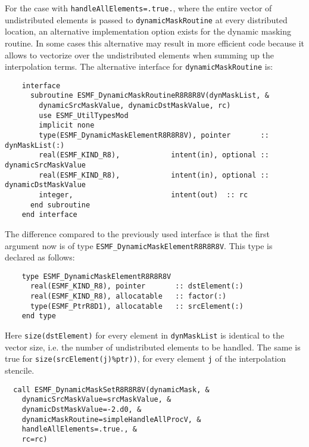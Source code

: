 
   For the case with {\tt handleAllElements=.true.}, where the entire
   vector of undistributed elements is passed to {\tt dynamicMaskRoutine} at
   every distributed location, an alternative implementation option exists for
   the dynamic masking routine. In some cases this alternative may result in
   more efficient code because it allows to vectorize over the undistributed
   elements when summing up the interpolation terms. The alternative interface
   for {\tt dynamicMaskRoutine} is:
  
   \begin{verbatim}
    interface
      subroutine ESMF_DynamicMaskRoutineR8R8R8V(dynMaskList, &
        dynamicSrcMaskValue, dynamicDstMaskValue, rc)
        use ESMF_UtilTypesMod
        implicit none
        type(ESMF_DynamicMaskElementR8R8R8V), pointer       :: dynMaskList(:)
        real(ESMF_KIND_R8),            intent(in), optional :: dynamicSrcMaskValue
        real(ESMF_KIND_R8),            intent(in), optional :: dynamicDstMaskValue
        integer,                       intent(out)  :: rc
      end subroutine
    end interface
   \end{verbatim}
  
   The difference compared to the previously used interface is that the first
   argument now is of type {\tt ESMF\_DynamicMaskElementR8R8R8V}. This type is
   declared as follows:
  
   \begin{verbatim}
    type ESMF_DynamicMaskElementR8R8R8V
      real(ESMF_KIND_R8), pointer       :: dstElement(:)
      real(ESMF_KIND_R8), allocatable   :: factor(:)
      type(ESMF_PtrR8D1), allocatable   :: srcElement(:)
    end type
   \end{verbatim}
  
   Here {\tt size(dstElement)} for every element in {\tt dynMaskList} is
   identical to the vector size, i.e. the number of undistributed elements to 
   be handled. The same is true for {\tt size(srcElement(j)\%ptr))}, for every
   element {\tt j} of the interpolation stencile. 

 \begin{verbatim}
  call ESMF_DynamicMaskSetR8R8R8V(dynamicMask, &
    dynamicSrcMaskValue=srcMaskValue, &
    dynamicDstMaskValue=-2.d0, &
    dynamicMaskRoutine=simpleHandleAllProcV, &
    handleAllElements=.true., &
    rc=rc)
 
\end{verbatim}
 
